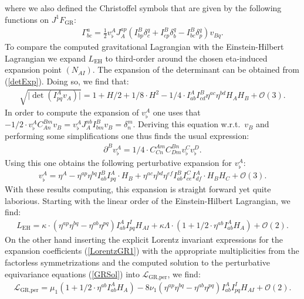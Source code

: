 where we also defined the Christoffel symbols that are given by the following functions on $J^1F_{\text{GR}}$:
\begin{align}
\Gamma^a_{bc} = \frac{1}{2} v_{\flat}^A J_A^{ap} \left ( I^B_{bp}\delta^q_c + I^B_{cp}\delta^q_b - I^B_{bc}\delta^q_p  \right ) v_{Bq}.
\end{align}
To compare the computed gravitational Lagrangian with the Einstein-Hilbert Lagrangian we expand $L_{\text{EH}}$ to third-order around the chosen eta-induced expansion point $(N_{AI})$. The expansion of the determinant can be obtained from (\ref{detExp}). Doing so, we find that:
\begin{align}
   \sqrt{\vert \operatorname{det} \left ( I^A_{pq}v_A \right ) \vert } = 1 + H/2 +1/8 \cdot H^2 - 1/4 \cdot I^A_{ab}I^B_{cd} \eta^{ac} \eta^{bd} H_A H_B + \mathcal{O}(3).   
\end{align}
In order to compute the expansion of $v^A_{\flat}$ one uses that $-1/2 \cdot v_{\flat}^AC_{An}^{Bm}v_B = v_{\flat}^A J_A^{nb}I^B_{bm}v_B = \delta^m_n$. Deriving this equation w.r.t.\ $v_B$ and performing some simplifications one thus finds the usual expression:
\begin{align}
    \partial^Bv_{\flat}^A = 1/4 \cdot C_{Cn}^{Am}C_{Dm}^{Bn}v_{\flat}^C v_{\flat}^{D}.
\end{align}
Using this one obtains the following perturbative expansion for $v_{\flat}^A$:
\begin{align}
    v_{\flat}^A = \eta^A - \eta^{ap}\eta^{bq} I^B_{ab} I^A_{pq} \cdot H_B + \eta^{ac}\eta^{bd}\eta^{ef} I^B_{ab} I^C_{ce} I^A_{df} \cdot H_BH_C + \mathcal{O}(3).  
\end{align}
With these results computing, this expansion is straight forward yet quite laborious.
Starting with the linear order of the Einstein-Hilbert Lagrangian, we find:
\begin{align}
        L_{\text{EH}} = \kappa \cdot (\eta^{ap}\eta^{bq} - \eta^{ab}\eta^{pq}) I^{A}_{ab}I^{I}_{pq} H_{AI} + \kappa \Lambda \cdot (1 + 1/2 \cdot \eta^{ab} I_{ab}^A H_A) + \mathcal{O}(2).
\end{align}
On the other hand inserting the explicit Lorentz invariant expressions for the expansion coefficients (\ref{LorentzGR1}) with the appropriate multiplicities from the factorless symmetrizations and the computed solution to the perturbative equivariance equations (\ref{GRSol}) into $\mathcal{L}_{\text{GR,per}}$, we find:
\begin{align}
    \mathcal{L}_{\text{GR,per}} = \mu_1(1 + 1/2 \cdot \eta^{ab} I_{ab}^A H_A) - 8 \nu_1 \left(\eta^{ap}\eta^{bq} - \eta^{ab}\eta^{pq} \right )I^{A}_{ab}I^{I}_{pq} H_{AI} + \mathcal{O}(2).
\end{align}
